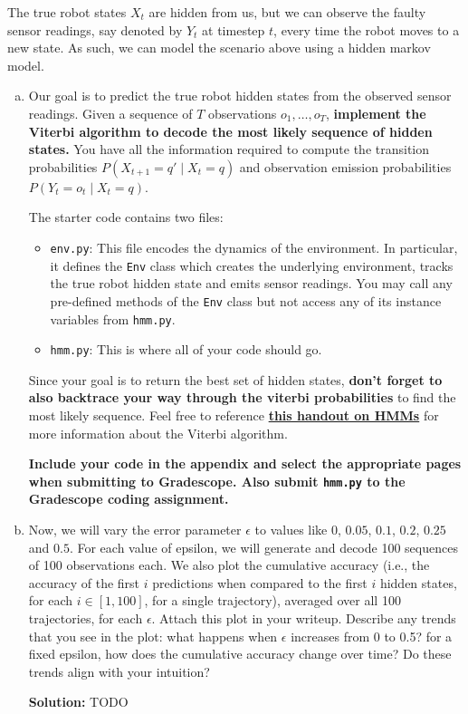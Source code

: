 \documentclass{article}
\newenvironment{solution}{\color{blue} \smallskip \textbf{Solution:}}{}
\begin{document}
The true robot states $X_t$ are hidden from us, but we can observe the faulty sensor readings, say denoted by $Y_t$ at timestep $t$, every time the robot moves to a new state. 
As such, we can model the scenario above using a hidden markov model.

\begin{enumerate}[(a)]
    \item 
    Our goal is to predict the true robot hidden states from the observed sensor readings. 
    Given a sequence of $T$ observations $o_1, \dots, o_T$, \textbf{implement the Viterbi algorithm to decode the most likely sequence of hidden states.} 
    You have all the information required to compute the transition probabilities $P(X_{t+1} = q' \mid X_t = q)$ and observation emission probabilities $P(Y_t = o_t \mid X_t = q)$.

    The starter code contains two files:
    \begin{itemize}
        \item \texttt{env.py}: This file encodes the dynamics of the environment.
        In particular, it defines the \texttt{Env} class which creates the underlying environment, tracks the true robot hidden state and emits sensor readings.  
        You may call any pre-defined methods of the \texttt{Env} class but not access any of its instance variables from \texttt{hmm.py}.
        \item \texttt{hmm.py}: This is where all of your code should go.
    \end{itemize}

    Since your goal is to return the best set of hidden states, \textbf{don't forget to also backtrace your way through the viterbi probabilities} to find the most likely sequence. Feel free to reference \href{https://web.stanford.edu/~jurafsky/slp3/A.pdf}{\textbf{this handout on HMMs}} for more information about the Viterbi algorithm.

    \textbf{Include your code in the appendix and select the appropriate pages when submitting to Gradescope. Also submit \texttt{hmm.py} to the Gradescope coding assignment.}

    \item 
    Now, we will vary the error parameter $\epsilon$ to values like $0$, $0.05$, $0.1$, $0.2$, $0.25$ and $0.5$. For each value of epsilon, we will generate and decode 100 sequences of 100 observations each. We also plot the cumulative accuracy (i.e., the accuracy of the first $i$ predictions when compared to the first $i$ hidden states, for each $i \in [1, 100]$, for a single trajectory), averaged over all 100 trajectories, for each $\epsilon$. Attach this plot in your writeup. Describe any trends that you see in the plot: what happens when $\epsilon$ increases from 0 to 0.5? for a fixed epsilon, how does the cumulative accuracy change over time? Do these trends align with your intuition?

    \begin{solution}
        TODO
    \end{solution}
\end{enumerate}
\end{document}
